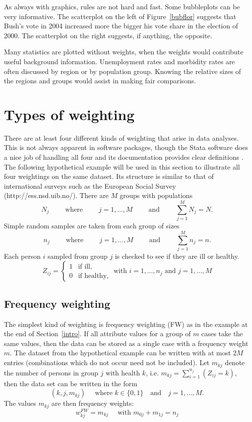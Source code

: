 \documentclass{svmult}
\begin{document}
As always with graphics, rules are not hard and fast.  Some bubbleplots can be very informative.  The scatterplot on the left of Figure~\ref{bubflor} suggests that Bush's vote in 2004 increased more the bigger his vote share in the election of 2000.  The scatterplot on the right suggests, if anything, the opposite. 

Many statistics are plotted without weights, when the weights would contribute useful background information.  Unemployment rates and morbidity rates are often discussed by region or by population group.  Knowing the relative sizes of the regions and groups would assist in making fair comparisons.

\section{Types of weighting}
\label{types}
There are at least four different kinds of weighting that arise in data analyses.  This is not always apparent in software packages, though the Stata software does a nice job of handling all four and its documentation provides clear definitions \citep{stata:2007}.  The following hypothetical example will be used in this section to illustrate all four weightings on the same dataset.  Its structure is similar to that of international surveys such as the European Social Survey (http://ess.nsd.uib.no/).  There are $M$ groups with populations
$$N_j\qquad \text{ where }\qquad j=1,\dots,M\qquad\text{ and }\qquad \sum_{j=1}^MN_j=N.$$
Simple random samples are taken from each group of sizes
$$n_j\qquad\text{ where }\qquad j=1,\dots,M\qquad\text{ and }\qquad \sum_{j=1}^Mn_j=n.$$
Each person $i$ sampled from group $j$ is checked to see if they are ill or healthy.
\[
Z_{ij}=\begin{cases}
  1    & \text{if ill}, \\
  0    & \text{if healthy},
\end{cases}
\text{ with } i=1,\dots,n_j \text{ and } j=1,\dots,M
\]

\subsection{Frequency weighting}
\label{fw}
The simplest kind of weighting is frequency weighting (FW) as in the example at the end of Section~\ref{intro}.  If all attribute values for a group of $m$ cases take the same values, then the data can be stored as a single case with a frequency weight $m$.  The dataset from the hypothetical example can be written with at most $2M$ entries (combinations which do not occur need not be included). Let $m_{kj}$ denote the number of persons in group $j$ with health $k$, i.e. $m_{kj} = \sum_{i=1}^{n_j} \left( Z_{ij} = k \right)$, then the data set can be written in the form
$$(k,j, m_{kj}) \quad \text{ where } k\in\{0,1\}\quad\text{and}\quad j=1,\dots,M.$$
The values $m_{kj}$ are then frequency weights:
$$w_{kj}^{FW}=m_{kj}\quad \mbox{ with } m_{0j}+m_{1j}=n_j$$
\end{document}
